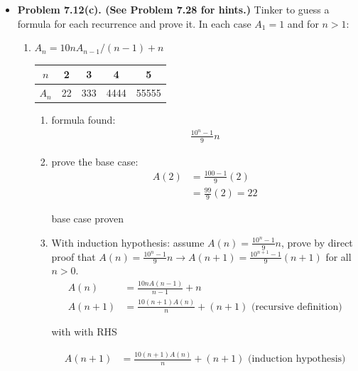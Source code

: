 \documentclass{article}
\begin{document}
\begin{itemize}
\begin{enumerate}[label=(\roman*)]
        \end{enumerate}
        \item \textbf{Problem 7.12(c). (See Problem 7.28 for hints.)} Tinker to guess a formula for each recurrence and prove it. In each case $A_1 = 1$ and for $n > 1$:
        \begin{enumerate}[label=(c)]
            \item $A_n = 10nA_{n-1} / (n-1) + n$
            \newline
            \begin{tabular}{ |c|c|c|c|c| } 
                \hline
                $n$ & 2 & 3 & 4 & 5\\ 
                \hline
                $A_n$ & 22 & 333 & 4444 & 55555 \\
                \hline
            \end{tabular}
            \begin{enumerate}[label=\roman*.]
                \item formula found:
                \begin{align*}
                    \frac{10^n-1}{9}n
                \end{align*}
                \item prove the base case:
                \begin{align*}
                    A(2) &= \frac{100-1}{9}(2)\\
                         &= \frac{99}{9}(2) = 22
                \end{align*}
                \begin{center}
                    base case proven
                \end{center}
                \item With induction hypothesis: assume $A(n) = \frac{10^n - 1}{9}n$, prove by direct proof that $A(n) = \frac{10^n - 1}{9}n \rightarrow A(n+1) = \frac{10^{n+1} - 1}{9}(n+1)$ for all $n > 0$.
                \begin{align*}
                    A(n) &= \frac{10nA(n-1)}{n-1}+n\\
                    A(n+1) &= \frac{10(n+1)A(n)}{n} + (n+1) \text{ (recursive definition)}
                \end{align*}
                \begin{center}
                    with with RHS
                \end{center}
                \begin{align*}
                    A(n+1) &= \frac{10(n+1)A(n)}{n} + (n+1) \text{ (induction hypothesis)}\\

\end{align*}
\end{enumerate}
\end{enumerate}
\end{itemize}
\end{document}
